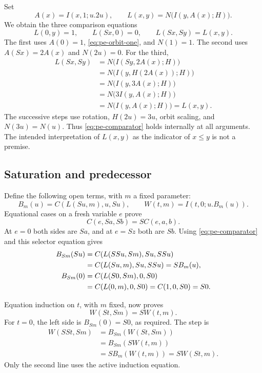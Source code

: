 Set
\[
 A(x)=I(x,1;u.2u),\qquad
 L(x,y)=N\bigl(I(y,A(x);H)\bigr).
\]
We obtain the three comparison equations
\begin{equation}
 L(0,y)=1,\qquad L(Sx,0)=0,\qquad L(Sx,Sy)=L(x,y).
 \label{eq:pe-comparator}
\end{equation}
The first uses $A(0)=1$, \eqref{eq:pe-orbit-one}, and $N(1)=1$.
The second uses $A(Sx)=2A(x)$ and $N(2u)=0$.  For the third,
\begin{align*}
 L(Sx,Sy)
 &=N\bigl(I(Sy,2A(x);H)\bigr)\\
 &=N\bigl(I(y,H(2A(x));H)\bigr)\\
 &=N\bigl(I(y,3A(x);H)\bigr)\\
 &=N\bigl(3I(y,A(x);H)\bigr)\\
 &=N\bigl(I(y,A(x);H)\bigr)=L(x,y).
\end{align*}
The successive steps use rotation, $H(2u)=3u$, orbit scaling, and
$N(3u)=N(u)$.  Thus \eqref{eq:pe-comparator} holds internally at all
arguments.  The intended interpretation of $L(x,y)$ as the indicator of
$x\leq y$ is not a premise.

\subsection{Saturation and predecessor}

Define the following open terms, with $m$ a fixed parameter:
\[
 B_m(u)=C(L(Su,m),u,Su),\qquad
 W(t,m)=I(t,0;u.B_m(u)).
\]
Equational cases on a fresh variable $e$ prove
\begin{equation}
 C(e,Sa,Sb)=S C(e,a,b).
 \label{eq:pe-selector-succ}
\end{equation}
At $e=0$ both sides are $Sa$, and at $e=Sz$ both are $Sb$.
Using \eqref{eq:pe-comparator} and this selector equation gives
\begin{align}
 B_{Sm}(Su)
 &=C(L(SSu,Sm),Su,SSu)\notag\\
 &=C(L(Su,m),Su,SSu)=S B_m(u),
 \label{eq:pe-saturation-conjugacy}\\
 B_{Sm}(0)
 &=C(L(S0,Sm),0,S0)\notag\\
 &=C(L(0,m),0,S0)=C(1,0,S0)=S0.
 \label{eq:pe-saturation-base}
\end{align}

Equation induction on $t$, with $m$ fixed, now proves
\begin{equation}
 W(St,Sm)=S W(t,m).
 \label{eq:pe-saturation-shift}
\end{equation}
For $t=0$, the left side is $B_{Sm}(0)=S0$, as required.  The step is
\begin{align*}
 W(SSt,Sm)
 &=B_{Sm}(W(St,Sm))\\
 &=B_{Sm}(S W(t,m))\\
 &=S B_m(W(t,m))=S W(St,m).
\end{align*}
Only the second line uses the active induction equation.

